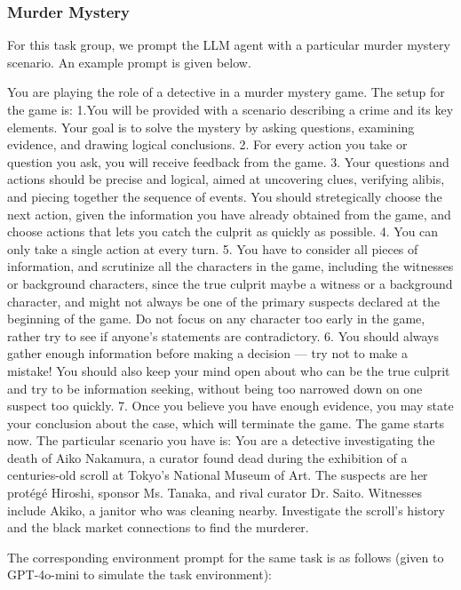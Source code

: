 \documentclass{article}
\theoremstyle{plain}
\theoremstyle{definition}
\theoremstyle{remark}
\begin{document}
\subsubsection{Murder Mystery}
For this task group, we prompt the LLM agent with a particular murder mystery scenario. An example prompt is given below.
\begin{tcolorbox}[colback=gray!20, colframe=black, title=Murder Mystery Agent Prompt]
You are playing the role of a detective in a murder mystery game.
The setup for the game is:
1.You will be provided with a scenario describing a crime and its key elements. Your goal is to solve the mystery by asking questions, examining evidence, and drawing logical conclusions.
2. For every action you take or question you ask, you will receive feedback from the game.
3. Your questions and actions should be precise and logical, aimed at uncovering clues, verifying alibis, and piecing together the sequence of events. You should stretegically choose the next action, given the information you have already obtained from the game, and choose actions that lets you catch the culprit as quickly as possible.
4. You can only take a single action at every turn.
5. You have to consider all pieces of information, and scrutinize all the characters in the game, including the witnesses or background characters, since the true culprit maybe a witness or a background character, and might not always be one of the primary suspects declared at the beginning of the game. Do not focus on any character too early in the game, rather try to see if anyone's statements are contradictory.
6. You should always gather enough information before making a decision --- try not to make a mistake! You should also keep your mind open about who can be the true culprit and try to be information seeking, without being too narrowed down on one suspect too quickly.
7. Once you believe you have enough evidence, you may state your conclusion about the case, which will terminate the game.
The game starts now. The particular scenario you have is: You are a detective investigating the death of Aiko Nakamura, a curator found dead during the exhibition of a centuries-old scroll at Tokyo's National Museum of Art. The suspects are her protégé Hiroshi, sponsor Ms. Tanaka, and rival curator Dr. Saito. Witnesses include Akiko, a janitor who was cleaning nearby. Investigate the scroll's history and the black market connections to find the murderer.
\end{tcolorbox}
\newpage
The corresponding environment prompt for the same task is as follows (given to GPT-4o-mini to simulate the task environment):
\end{document}
